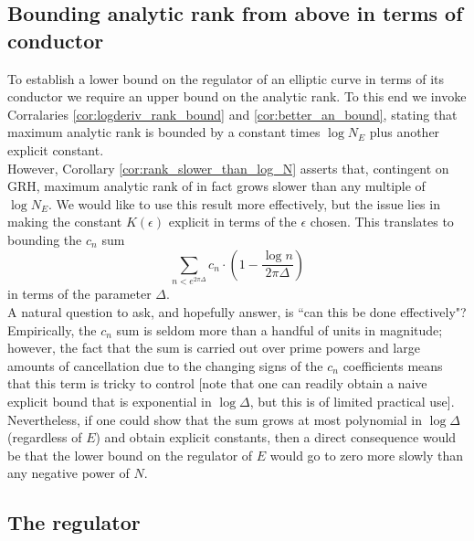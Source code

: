 \subsection{Bounding analytic rank from above in terms of conductor}

To establish a lower bound on the regulator of an elliptic curve in terms of its conductor we require an upper bound on the analytic rank. To this end we invoke Corralaries \ref{cor:logderiv_rank_bound} and \ref{cor:better_an_bound}, stating that maximum analytic rank is bounded by a constant times $\log N_E$ plus another explicit constant. \\

However, Corollary \ref{cor:rank_slower_than_log_N} asserts that, contingent on GRH, maximum analytic rank of in fact grows slower than any multiple of $\log N_E$. We would like to use this result more effectively, but the issue lies in making the constant $K(\epsilon)$ explicit in terms of the $\epsilon$ chosen. This translates to bounding the $c_n$ sum
\begin{equation}
\sum_{n < e^{2\pi \Delta}} c_n \cdot \left(1-\frac{\log n}{2\pi \Delta}\right)
\end{equation}
in terms of the parameter $\Delta$. \\

A natural question to ask, and hopefully answer, is ``can this be done effectively"? Empirically, the $c_n$ sum is seldom more than a handful of units in magnitude; however, the fact that the sum is carried out over prime powers and large amounts of cancellation due to the changing signs of the $c_n$ coefficients means that this term is tricky to control [note that one can readily obtain a naive explicit bound that is exponential in $\log \Delta$, but this is of limited practical use]. \\

Nevertheless, if one could show that the sum grows at most polynomial in $\log \Delta$ (regardless of $E$) and obtain explicit constants, then a direct consequence would be that the lower bound on the regulator of $E$ would go to zero more slowly than any negative power of $N$. \\

\subsection{The regulator}

